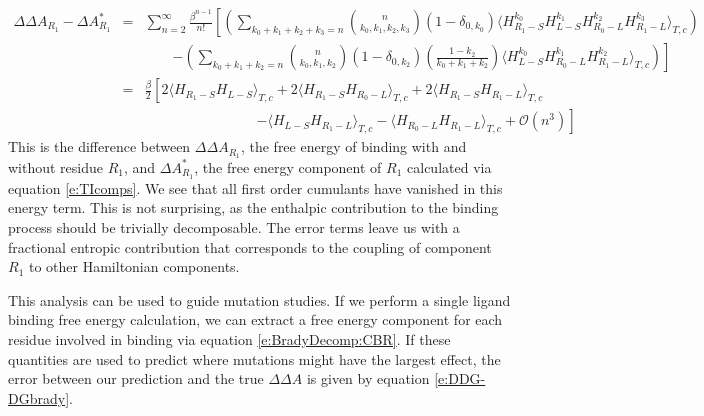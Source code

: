 \documentclass[%
 preprint,
 amsmath,amssymb,
 aps,
]{revtex4-1}
\begin{document}
 \begin{eqnarray}
 \Delta \Delta A_{R_1} - \Delta A^*_{R_1}  &=&
 \sum_{n=2}^{\infty}  \frac{\beta^{n-1}}{n!} 
\left[
\left(
 \sum_{k_0+k_1+k_2+k_3=n} 
{ n \choose k_0,k_1,k_2,k_3 }  \left( 1- \delta_{0,k_0} \right) \langle  H_{R_1-S}^{k_0} H_{L-S}^{k_1} H_{R_0-L}^{k_2} H_{R_1-L}^{k_3} 
\rangle_{T,c}
\right) \right.  \nonumber \\ && \qquad \left. 
- 
\left(
 \sum_{k_0+k_1+k_2=n} 
{ n \choose k_0,k_1,k_2 }  \left( 1- \delta_{0,k_2} \right)\left( \frac{1-k_2}{k_0+k_1+k_2} \right) \langle  H_{L-S}^{k_0} H_{R_0-L}^{k_1} H_{R_1-L}^{k_2} 
\rangle_{T,c}
\right) 
\right] \nonumber \\ & = &
\frac{\beta}{2} \left[ 
2\langle  H_{R_1-S} H_{L-S} \rangle_{T,c} + 2\langle  H_{R_1-S} H_{R_0-L} \rangle_{T,c}
+2 \langle  H_{R_1-S} H_{R_1-L} \rangle_{T,c}
\right. \nonumber \\ & & \qquad \qquad \qquad \qquad \left. 
- \langle  H_{L-S} H_{R_1-L} \rangle_{T,c} -  \langle  H_{R_0-L} H_{R_1-L} \rangle_{T,c}
+ \mathcal{O} (n^3)
\right]
\label{e:DDG-DGbrady}
 \end{eqnarray}
 This is the difference between $\Delta \Delta A_{R_1}$, the free energy of binding with and without residue $R_1$, and $\Delta A^*_{R_1}$, the free
 energy component of $R_1$ calculated via equation \ref{e:TIcomps}.   
 We see that all first order cumulants have vanished in this energy term.  This is not surprising, as the enthalpic contribution to the binding process should 
 be trivially decomposable.  The error terms leave us with a fractional entropic contribution that corresponds to the coupling of component $R_1$ to other Hamiltonian components.
 
 This analysis can be used to guide mutation studies.  If we perform a single ligand binding free energy calculation, we can extract a free energy component for each residue involved in binding via equation \ref{e:BradyDecomp:CBR}.  If these quantities are used to predict where mutations might have the largest effect, the error between our prediction and the true $\Delta \Delta A$ is given by equation \ref{e:DDG-DGbrady}.  
 
 
\end{document}
